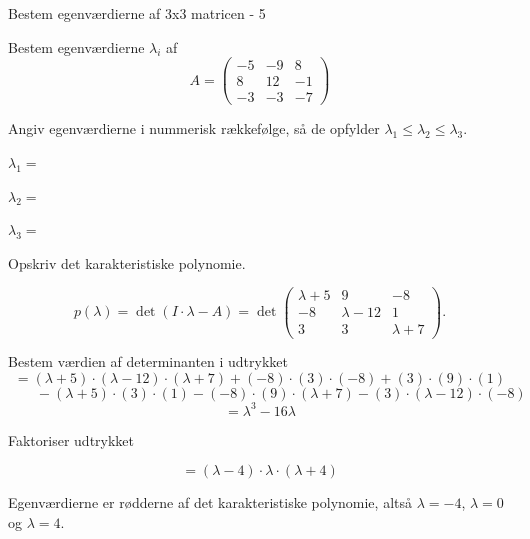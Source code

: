 \documentclass{article}
\begin{document}
\begin{exercise}{Bestem egenværdierne af 3x3 matricen - 5}

Bestem egenværdierne $\lambda_i$ af
\[
A=\begin{pmatrix}
-5 & -9 & 8 \\
8 & 12 & -1 \\
-3 & -3 & -7
\end{pmatrix}
\]

Angiv egenværdierne i nummerisk rækkefølge, så de
opfylder $\lambda_1 \le \lambda_2 \le \lambda_3$.

$\lambda_1 = $ 

$\lambda_2 = $ 

$\lambda_3 = $ 

\hint
Opskriv det karakteristiske polynomie.

\hint
\[
p(\lambda)=\det\left(I \cdot \lambda - A \right)=\det\begin{pmatrix}
\lambda + 5 & 9 & -8 \\
-8 & \lambda - 12 & 1 \\
3 & 3 & \lambda + 7
\end{pmatrix}.
\]

\hint
Bestem værdien af determinanten i udtrykket
\[
=(\lambda + 5) \cdot (\lambda - 12) \cdot (\lambda + 7)+(-8) \cdot (3) \cdot (-8)+(3) \cdot (9) \cdot (1)
\]
\[
\qquad -(\lambda + 5) \cdot (3) \cdot (1)-(-8) \cdot (9) \cdot (\lambda + 7)-(3) \cdot (\lambda - 12) \cdot (-8)
\]
\[
=\lambda^3 - 16\lambda
\]

\hint
Faktoriser udtrykket

\hint
\[
=(\lambda - 4) \cdot \lambda \cdot (\lambda + 4)
\]

\hint
Egenværdierne er rødderne af det karakteristiske polynomie,
altså
$\lambda=-4$, $\lambda=0$ og $\lambda=4$.

\end{exercise}
\end{document}
